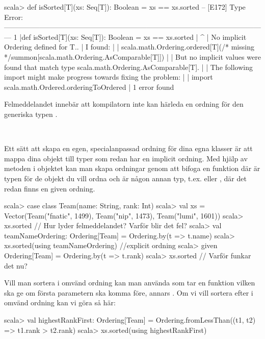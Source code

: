 \SubtaskSolved 
\begin{REPL}
scala> def isSorted[T](xs: Seq[T]): Boolean = xs == xs.sorted
-- [E172] Type Error: ---------------------------------------------------------------------------------------------------------------
1 |def isSorted[T](xs: Seq[T]): Boolean = xs == xs.sorted
  |                                                      ^
  |                                   No implicit Ordering defined for T..
  |                                   I found:
  |
  |                                       scala.math.Ordering.ordered[T](/* missing */summon[scala.math.Ordering.AsComparable[T]])
  |
  |                                   But no implicit values were found that match type scala.math.Ordering.AsComparable[T].
  |
  |                                   The following import might make progress towards fixing the problem:
  |
  |                                     import scala.math.Ordered.orderingToOrdered
  |
1 error found
\end{REPL}
Felmeddelandet innebär att kompilatorn inte kan härleda en ordning för den generiska typen .

\QUESTEND







\QUESTBEGIN

\Task \label{task:custom-ordering} \what~

\Subtask Ett sätt att skapa en egen, specialanpassad ordning för dina egna klasser är att mappa dina objekt till typer som redan har en implicit ordning. Med hjälp av metoden  i objektet  kan man skapa ordningar genom att bifoga en funktion  där  är typen för de objekt du vill ordna och  är någon annan typ, t.ex.  eller , där det redan finns en given ordning.
\begin{REPL}
scala> case class Team(name: String, rank: Int)
scala> val xs =
         Vector(Team("fnatic", 1499), Team("nip", 1473), Team("lumi", 1601))
scala> xs.sorted  // Hur lyder felmeddelandet? Varför blir det fel?
scala> val teamNameOrdering: Ordering[Team] = Ordering.by(t => t.name)
scala> xs.sorted(using teamNameOrdering)   //explicit ordning
scala> given Ordering[Team] = Ordering.by(t => t.rank)
scala> xs.sorted   // Varför funkar det nu?
\end{REPL}

\Subtask Vill man sortera i omvänd ordning kan man använda
 som tar en funktion  vilken ska ge  om första parametern ska komma före, annars . Om vi vill sortera efter  i omvänd ordning kan vi göra så här:
\begin{REPL}
scala> val highestRankFirst: Ordering[Team] =
         Ordering.fromLessThan((t1, t2) => t1.rank > t2.rank)
scala> xs.sorted(using highestRankFirst)
\end{REPL}

